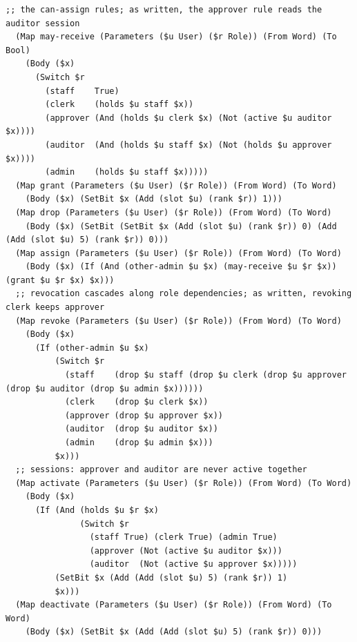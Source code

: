 \documentclass[11pt]{article}
\theoremstyle{definition}
\theoremstyle{plain}
\begin{document}
\begin{lstlisting}[style=mettafull]
  ;; the can-assign rules; as written, the approver rule reads the auditor session
  (Map may-receive (Parameters ($u User) ($r Role)) (From Word) (To Bool)
    (Body ($x)
      (Switch $r
        (staff    True)
        (clerk    (holds $u staff $x))
        (approver (And (holds $u clerk $x) (Not (active $u auditor $x))))
        (auditor  (And (holds $u staff $x) (Not (holds $u approver $x))))
        (admin    (holds $u staff $x)))))
  (Map grant (Parameters ($u User) ($r Role)) (From Word) (To Word)
    (Body ($x) (SetBit $x (Add (slot $u) (rank $r)) 1)))
  (Map drop (Parameters ($u User) ($r Role)) (From Word) (To Word)
    (Body ($x) (SetBit (SetBit $x (Add (slot $u) (rank $r)) 0) (Add (Add (slot $u) 5) (rank $r)) 0)))
  (Map assign (Parameters ($u User) ($r Role)) (From Word) (To Word)
    (Body ($x) (If (And (other-admin $u $x) (may-receive $u $r $x)) (grant $u $r $x) $x)))
  ;; revocation cascades along role dependencies; as written, revoking clerk keeps approver
  (Map revoke (Parameters ($u User) ($r Role)) (From Word) (To Word)
    (Body ($x)
      (If (other-admin $u $x)
          (Switch $r
            (staff    (drop $u staff (drop $u clerk (drop $u approver (drop $u auditor (drop $u admin $x))))))
            (clerk    (drop $u clerk $x))
            (approver (drop $u approver $x))
            (auditor  (drop $u auditor $x))
            (admin    (drop $u admin $x)))
          $x)))
  ;; sessions: approver and auditor are never active together
  (Map activate (Parameters ($u User) ($r Role)) (From Word) (To Word)
    (Body ($x)
      (If (And (holds $u $r $x)
               (Switch $r
                 (staff True) (clerk True) (admin True)
                 (approver (Not (active $u auditor $x)))
                 (auditor  (Not (active $u approver $x)))))
          (SetBit $x (Add (Add (slot $u) 5) (rank $r)) 1)
          $x)))
  (Map deactivate (Parameters ($u User) ($r Role)) (From Word) (To Word)
    (Body ($x) (SetBit $x (Add (Add (slot $u) 5) (rank $r)) 0)))


\end{lstlisting}
\end{document}
